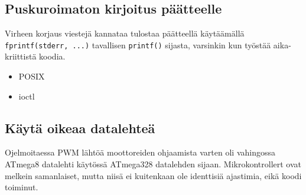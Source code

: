 \documentclass[]{article} %
\numberwithin{equation}{section}
\numberwithin{figure}{section}
\numberwithin{table}{section}
\begin{document}
\subsection{Puskuroimaton kirjoitus päätteelle}
\label{sub:Puskuroimaton kirjoitus paatteelle}

Virheen korjaus viestejä kannataa tulostaa päätteellä käytäämällä \verb+fprintf(stderr, ...)+ tavallisen \verb+printf()+ sijasta, varsinkin kun työstää aika-kriittistä koodia. 

\begin{itemize}
    \item POSIX
    \item ioctl
    
\end{itemize}

  
\subsection{Käytä oikeaa datalehteä}
\label{sub:Kayta oikeaa datalehtea}


Ojelmoitaessa PWM lähtöä moottoreiden ohjaamista varten oli vahingossa ATmega8 datalehti käytössä ATmega328 datalehden sijaan. Mikrokontrollert ovat melkein samanlaiset, mutta niisä ei kuitenkaan ole identtisiä ajastimia, eikä koodi toiminut. 
\end{document}
